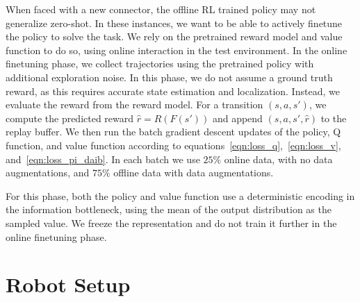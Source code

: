 When faced with a new connector, the offline RL trained policy may not generalize zero-shot.
In these instances, we want to be able to actively finetune the policy to solve the task.
We rely on the pretrained reward model and value function to do so, using online interaction in the test environment.
In the online finetuning phase, we collect trajectories using the pretrained policy with additional exploration noise.
In this phase, we do not assume a ground truth reward, as this requires accurate state estimation and localization.
Instead, we evaluate the reward from the reward model.
For a transition $(s, a, s')$, we compute the predicted reward $\hat{r} = R(F(s'))$ and append $(s, a, s', \hat{r})$ to the replay buffer.
We then run the batch gradient descent updates of the policy, Q function, and value function according to equations~\ref{eqn:loss_q},~\ref{eqn:loss_v}, and~\ref{eqn:loss_pi_daib}.
In each batch we use $25\%$ online data, with no data augmentations, and $75\%$ offline data with data augmentations.

For this phase, both the policy and value function use a deterministic encoding in the information bottleneck, using the mean of the output distribution as the sampled value.
We freeze the representation and do not train it further in the online finetuning phase.

\section{Robot Setup}

